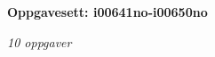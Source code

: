 \centerline{\bf Oppgavesett: i00641no-i00650no}
\vskip 10pt
\centerline{\it 10 oppgaver}\vskip 10pt
\vskip 10pt
